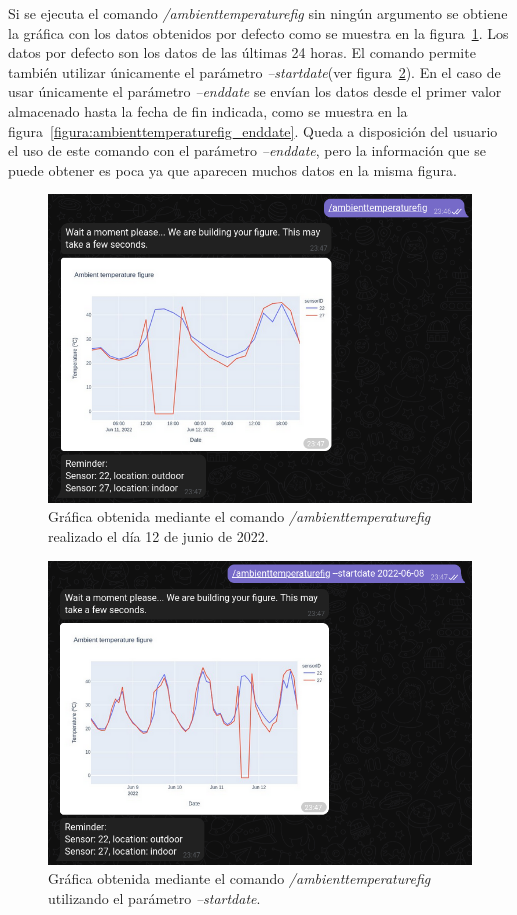 \documentclass[a4paper, 12pt, oneside]{book}
\begin{document}
Si se ejecuta el comando \textit{/ambienttemperaturefig} sin ningún argumento se obtiene la gráfica con los datos obtenidos por defecto como se muestra en la figura~\ref{figura:ambienttemperaturefig}. Los datos por defecto son los datos de las últimas 24 horas. El comando permite también utilizar únicamente el parámetro \textit{--startdate}(ver figura~\ref{figura:ambienttemperaturefig_startdate}). En el caso de usar únicamente el parámetro \textit{--enddate} se envían los datos desde el primer valor almacenado hasta la fecha de fin indicada, como se muestra en la figura~\ref{figura:ambienttemperaturefig_enddate}. Queda a disposición del usuario el uso de este comando con el parámetro \textit{--enddate}, pero la información que se puede obtener es poca ya que aparecen muchos datos en la misma figura.

\begin{figure}[H]
	\centering
    \includegraphics[width=12cm, keepaspectratio]{img/ambienttemperaturefig}
    \caption{Gráfica obtenida mediante el comando \textit{/ambienttemperaturefig} realizado el día 12 de junio de 2022.}
    \label{figura:ambienttemperaturefig}
\end{figure}

\begin{figure}[H]
	\centering
    \includegraphics[width=12cm, keepaspectratio]{img/ambienttemperaturefig_startdate}
    \caption{Gráfica obtenida mediante el comando \textit{/ambienttemperaturefig} utilizando el parámetro \textit{--startdate}.}
    \label{figura:ambienttemperaturefig_startdate}
\end{figure}
\end{document}
